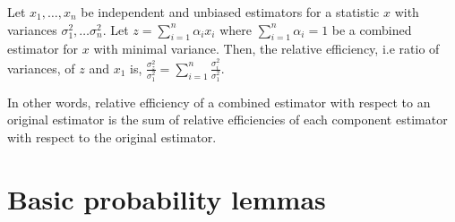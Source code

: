 % 

\begin{lemma}
  Let $x_1, \dots, x_n$ be independent and unbiased estimators for a statistic $x$ with variances $\sigma_1^2, \dots \sigma_n^2$.
  Let $z = \sum_{i=1}^n \alpha_i x_i$ where $\sum_{i=1}^n \alpha_i = 1$ be a combined estimator for $x$ with minimal variance.
  Then, the relative efficiency, i.e ratio of variances, of $z$ and $x_1$ is,
  $\frac{\sigma_z^2}{\sigma_1^2} = \sum_{i=1}^n \frac{\sigma_i^2}{\sigma_1^2}$.

  In other words, relative efficiency of a combined estimator with respect
  to an original estimator is the sum of relative efficiencies of each component
  estimator with respect to the original estimator. 
\end{lemma}


\section{Basic probability lemmas}
\label{sec:probability}


